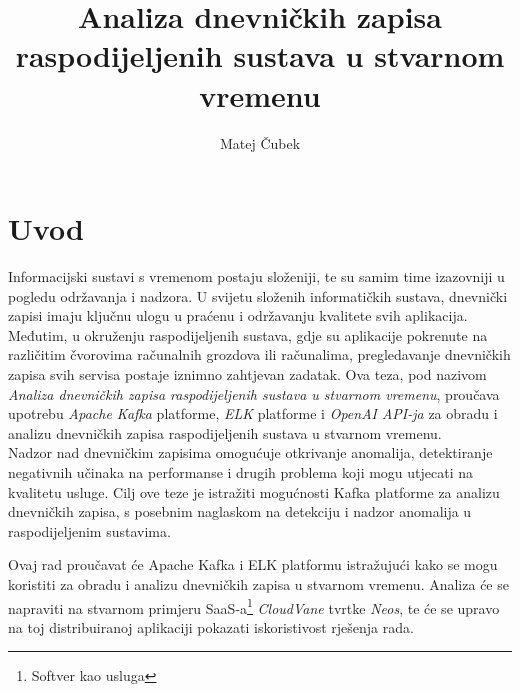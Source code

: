 \documentclass[times, utf8, diplomski]{fer}
\begin{document}

\title{Analiza dnevničkih zapisa raspodijeljenih sustava u stvarnom vremenu}

\author{Matej Čubek}

\maketitle

\zahvala{}

\renewcommand{\lstlistingname}{Isječak koda}%
\renewcommand{\lstlistlistingname}{Indeks isječka kodova}%


\tableofcontents


\begingroup
\renewcommand*\listfigurename{Indeks slika}
\renewcommand*\listtablename{Indeks tablica}

\listoffigures

\listoftables

\endgroup

\chapter{Uvod}

Informacijski sustavi s vremenom postaju složeniji, te su samim time izazovniji u pogledu održavanja i nadzora. U svijetu složenih informatičkih sustava, dnevnički zapisi imaju ključnu ulogu u praćenu i održavanju kvalitete svih aplikacija. Međutim, u okruženju raspodijeljenih sustava, gdje su aplikacije pokrenute na različitim čvorovima računalnih grozdova ili računalima, pregledavanje dnevničkih zapisa svih servisa postaje iznimno zahtjevan zadatak. Ova teza, pod nazivom \emph{\glqq Analiza dnevničkih zapisa raspodijeljenih sustava u stvarnom vremenu\grqq}, proučava upotrebu \emph{Apache Kafka} platforme, \emph{ELK} platforme i \emph{OpenAI API-ja} za obradu i analizu dnevničkih zapisa raspodijeljenih sustava u stvarnom vremenu.\\

Nadzor nad dnevničkim zapisima omogućuje otkrivanje anomalija, detektiranje negativnih učinaka na performanse i drugih problema koji mogu utjecati na kvalitetu usluge. Cilj ove teze je istražiti mogućnosti Kafka platforme za analizu dnevničkih zapisa, s posebnim naglaskom na detekciju i nadzor anomalija u raspodijeljenim sustavima.

Ovaj rad proučavat će Apache Kafka  i ELK platformu istražujući kako se mogu koristiti za obradu i analizu dnevničkih zapisa u stvarnom vremenu. Analiza će se napraviti na stvarnom primjeru SaaS-a\footnote{Softver kao usluga } \emph{CloudVane} tvrtke \emph{Neos}, te će se upravo na toj distribuiranoj aplikaciji pokazati iskoristivost rješenja rada.
\end{document}
